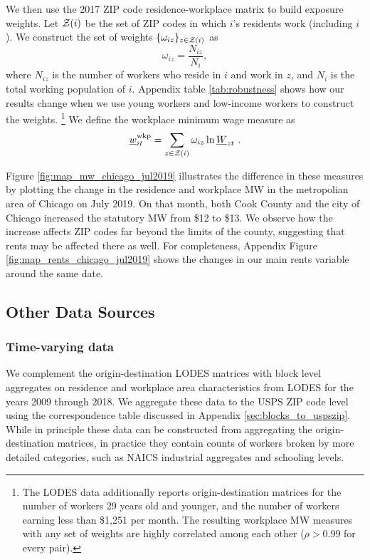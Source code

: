 We then use the 2017 ZIP code residence-workplace matrix to build exposure 
weights.
Let $\mathcal{Z}(i)$ be the set of ZIP codes in which $i$'s residents work 
(including $i$).
We construct the set of weights $\{\omega_{iz}\}_{z\in\mathcal{Z}(i)}$ as 
$$
\omega_{iz} = \frac{N_{iz}}{N_i} ,
$$
where 
$N_{iz}$ is the number of workers who reside in $i$ and work in $z$, 
and $N_i$ is the total working population of $i$.
Appendix table \ref{tab:robustness} shows how our results change when we 
use young workers and low-income workers to construct the weights.%
\footnote{The LODES data additionally reports origin-destination matrices for 
the number of workers 29 years old and younger, and the number of workers 
earning less than \$1,251 per month.
The resulting workplace MW measures with any set of weights are highly correlated 
among each other ($\rho>0.99$ for every pair).}
We define the workplace minimum wage measure as
\begin{equation}
    \underline{w}^{\text{wkp}}_{it} = \sum_{z\in\mathcal{Z}(i)} \omega_{iz} \ln \underline{W}_{zt} \ .
\end{equation}

Figure \ref{fig:map_mw_chicago_jul2019} illustrates the difference in these 
measures by plotting the change in the residence and workplace MW 
in the metropolian area of Chicago on July 2019.
On that month, both Cook County and the city of Chicago increased the statutory 
MW from \$12 to \$13.
We observe how the increase affects ZIP codes far beyond the limits of the 
county, suggesting that rents may be affected there as well.
For completeness, Appendix Figure \ref{fig:map_rents_chicago_jul2019} shows
the changes in our main rents variable around the same date.


\subsection{Other Data Sources}\label{sec:data_other}

\subsubsection{Time-varying data}
\label{sec:data_other_timevarying}

We complement the origin-destination LODES matrices with block level aggregates 
on residence and workplace area characteristics from LODES 
\parencite{CensusLODES} for the years 2009 through 2018.
We aggregate these data to the USPS ZIP code level using the correspondence
table discussed in Appendix \ref{sec:blocks_to_uspszip}.
While in principle these data can be constructed from aggregating the 
origin-destination matrices, in practice they contain counts of workers broken
by more detailed categories, such as NAICS industrial aggregates and 
schooling levels.

